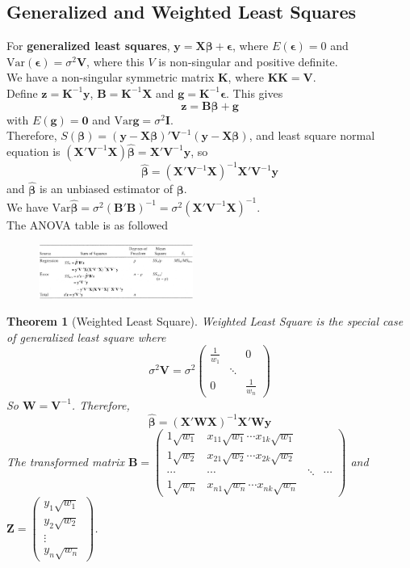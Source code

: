 \documentclass[11pt]{article}
\newcommand{\var}{\mathrm{Var}}
\newtheorem{theorem}{Theorem}[section]
\theoremstyle{definition}
\begin{document}
\subsection{Generalized and Weighted Least Squares}
For \textbf{generalized least squares}, $\bm{y}=\bm{X\beta}+\bm{\epsilon}$, where $E(\bm{\epsilon})=0$ and $\var(\bm{\epsilon})=\sigma^2\bm{V}$, where this $V$ is non-singular and positive definite.\\
We have a non-singular symmetric matrix $\bm{K}$, where $\bm{KK}=\bm{V}$.\\
Define $\bm{z}=\bm{K}^{-1}\bm{y}$, $\bm{B}=\bm{K}^{-1}\bm{X}$ and $\bm{g}=\bm{K}^{-1}\bm{\epsilon}$. This gives
\[
\bm{z}=\bm{B\beta}+\bm{g}
\]
with $E(\bm{g})=\bm{0}$ and $\var{\bm{g}}=\sigma^2\bm{I}$.\\
Therefore, $S(\bm{\beta})=(\bm{y}-\bm{X\beta})'\bm{V}^{-1}(\bm{y}-\bm{X\beta})$, and least square normal equation is $(\bm{X}'\bm{V}^{-1}\bm{X})\hat{\bm{\beta}}=\bm{X}'\bm{V}^{-1}\bm{y}$, so
\[
\hat{\bm{\beta}}=(\bm{X}'\bm{V}^{-1}\bm{X})^{-1}\bm{X}'\bm{V}^{-1}\bm{y}
\]
and $\hat{\bm{\beta}}$ is an unbiased estimator of $\bm{\beta}$.\\
We have $\var{\hat{\bm{\beta}}}=\sigma^2(\bm{B}'\bm{B})^{-1}=\sigma^2(\bm{X}'\bm{V}^{-1}\bm{X})^{-1}$.\\
The ANOVA table is as followed
\begin{figure}[h]
\centering
\includegraphics[width=0.45\textwidth]{2.png}
\end{figure}
\begin{theorem}[Weighted Least Square]
\normalfont Weighted Least Square is the special case of generalized least square where
\[
\sigma^2 \bm{V}=\sigma^2\begin{pmatrix}\frac{1}{w_1}&&0\\&\ddots&\\0&&\frac{1}{w_n}\end{pmatrix}
\]
So $\bm{W}=\bm{V}^{-1}$. Therefore, \[
\hat{\bm{\beta}}=(\bm{X}'\bm{W}\bm{X})^{-1}\bm{X}'\bm{W}\bm{y}
\]
The transformed matrix $\bm{B}=\begin{pmatrix}1\sqrt{w_1} & x_{11}\sqrt{w_1}\cdots x_{1k}\sqrt{w_1}\\1\sqrt{w_2} & x_{21}\sqrt{w_2}\cdots x_{2k}\sqrt{w_2}\\\cdots&\cdots& \ddots&\cdots\\1\sqrt{w_n} & x_{n1}\sqrt{w_n}\cdots x_{nk}\sqrt{w_n}\end{pmatrix}$ and $\bm{Z}=\begin{pmatrix}y_1\sqrt{w_1}\\y_2\sqrt{w_2}\\\vdots\\y_n\sqrt{w_n}\end{pmatrix}$.
\end{theorem}
\end{document}
